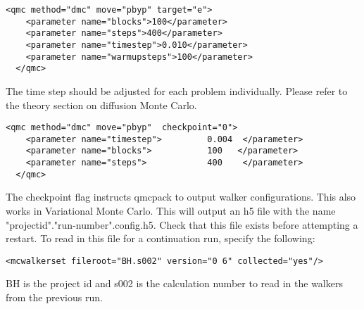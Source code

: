 \begin{itemize}


\end{itemize}

\begin{lstlisting}[style=QMCPXML,caption=The following is an example of a very simple DMC section. ]
  <qmc method="dmc" move="pbyp" target="e">
    <parameter name="blocks">100</parameter>
    <parameter name="steps">400</parameter>
    <parameter name="timestep">0.010</parameter>
    <parameter name="warmupsteps">100</parameter>
  </qmc>
\end{lstlisting}
The time step should be adjusted for each problem individually.  Please refer to the theory section
on diffusion Monte Carlo.


\begin{lstlisting}[style=QMCPXML,caption=The following is an example of running a simulation that can be restarted . ]
  <qmc method="dmc" move="pbyp"  checkpoint="0">
    <parameter name="timestep">         0.004  </parameter>
    <parameter name="blocks">           100   </parameter>
    <parameter name="steps">            400    </parameter>
  </qmc>
\end{lstlisting}
The checkpoint flag instructs qmcpack to output walker configurations.  This also
works in Variational Monte Carlo.  This will output an h5 file with the name "projectid"."run-number".config.h5.
Check that this file exists before attempting a restart.
To read in this file for a continuation run, specify the following:
\begin{lstlisting}[caption=Restart (read walkers from previous run) ]
 <mcwalkerset fileroot="BH.s002" version="0 6" collected="yes"/>
\end{lstlisting}
BH is the project id and s002 is the calculation number to read in the walkers from the previous run.\\

